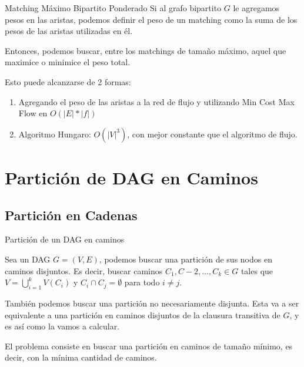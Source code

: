 \documentclass{beamer}
\begin{document}
\begin{frame}{Matching Máximo Bipartito Ponderado}
    Si al grafo bipartito $G$ le agregamos pesos en las aristas, podemos definir el peso de un matching como la suma de los pesos de las aristas utilizadas en él.

    Entonces, podemos buscar, entre los matchings de tamaño máximo, aquel que maximice o minimice el peso total.

    Esto puede alcanzarse de 2 formas:

    \begin{enumerate}
        \item Agregando el peso de las aristas a la red de flujo y utilizando Min Cost Max Flow en $O(|E|*|f|)$
        \item Algoritmo Hungaro: $O(|V|^3)$, con mejor constante que el algoritmo de flujo.
    \end{enumerate}
\end{frame}

\section{Partición de DAG en Caminos}
    \subsection{Partición en Cadenas}
    \begin{frame}{Partición de un DAG en caminos}
        
        \begin{definition}
           Sea un DAG $G = (V,E)$, podemos buscar una partición de sus nodos en caminos disjuntos. Es decir, buscar caminos $C_1, C-2, ..., C_k \in G$ tales que $V = \bigcup_{i=1}^k V(C_i)$ y $C_i \cap C_j = \emptyset$ para todo $i \neq j$.
        \end{definition}
        
        También podemos buscar una partición no necesariamente disjunta. Esta va a ser equivalente a una partición en caminos disjuntos de la clausura transitiva de $G$, y es así como la vamos a calcular.

        El problema consiste en buscar una partición en caminos de tamaño mínimo, es decir, con la mínima cantidad de caminos.
    \end{frame}
\end{document}
